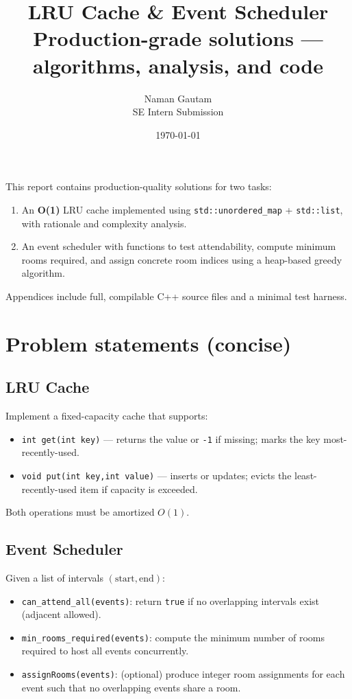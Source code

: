 \documentclass[11pt,a4paper]{article}
\title{\vspace{-12pt}\textbf{LRU Cache \& Event Scheduler} \\ \large Production-grade solutions — algorithms, analysis, and code}
\author{Naman Gautam \\ SE Intern Submission}
\date{\today}
\begin{document}
\maketitle

\begin{tcolorbox}[summary,title=Executive summary]
This report contains production-quality solutions for two tasks:
\begin{enumerate}[noitemsep,leftmargin=*]
  \item An \textbf{O(1)} LRU cache implemented using \texttt{std::unordered\_map} + \texttt{std::list}, with rationale and complexity analysis.
  \item An event scheduler with functions to test attendability, compute minimum rooms required, and assign concrete room indices using a heap-based greedy algorithm.
\end{enumerate}
Appendices include full, compilable C++ source files and a minimal test harness.
\end{tcolorbox}

\vspace{4pt}
\tableofcontents
\thispagestyle{empty}
\newpage

\section{Problem statements (concise)}
\subsection{LRU Cache}
Implement a fixed-capacity cache that supports:
\begin{itemize}
  \item \texttt{int get(int key)} — returns the value or \texttt{-1} if missing; marks the key most-recently-used.
  \item \texttt{void put(int key,int value)} — inserts or updates; evicts the least-recently-used item if capacity is exceeded.
\end{itemize}
Both operations must be amortized \(O(1)\).

\subsection{Event Scheduler}
Given a list of intervals \((\text{start},\text{end})\):
\begin{itemize}
  \item \texttt{can\_attend\_all(events)}: return \texttt{true} if no overlapping intervals exist (adjacent allowed).
  \item \texttt{min\_rooms\_required(events)}: compute the minimum number of rooms required to host all events concurrently.
  \item \texttt{assignRooms(events)}: (optional) produce integer room assignments for each event such that no overlapping events share a room.
\end{itemize}
\end{document}
